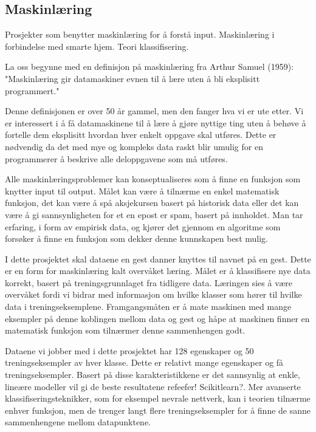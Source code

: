 \subsection{Maskinlæring}
{\color{blue}
Prosjekter som benytter maskinlæring for å forstå input. Maskinlæring i forbindelse med smarte hjem. Teori klassifisering.

La oss begynne med en definisjon på maskinlæring fra Arthur Samuel (1959): "Maskinlæring gir datamaskiner evnen til å lære uten å bli eksplisitt programmert."

Denne definisjonen er over 50 år gammel, men den fanger hva vi er ute etter. Vi er interessert i å få datamaskinene til å lære å gjøre nyttige ting uten å behøve å fortelle dem eksplisitt hvordan hver enkelt oppgave skal utføres. Dette er nødvendig da det med mye og kompleks data raskt blir umulig for en programmerer å beskrive alle deloppgavene som må utføres.

Alle maskinlæringsproblemer kan konseptualiseres som å finne en funksjon som knytter input til output. Målet kan være å tilnærme en enkel matematisk funksjon, det kan være å spå aksjekursen basert på historisk data eller det kan være å gi sannsynligheten for et en epost er spam, basert på innholdet. Man tar erfaring, i form av empirisk data, og kjører det gjennom en algoritme som forsøker å finne en funksjon som dekker denne kunnskapen best mulig.

I dette prosjektet skal dataene en gest danner knyttes til navnet på en gest. Dette er en form for maskinlæring kalt overvåket læring. Målet er å klassifisere nye data korrekt, basert på treningsgrunnlaget fra tidligere data. Læringen sies å være overvåket fordi vi bidrar med informasjon om hvilke klasser som hører til hvilke data i treningseksemplene. Framgangsmåten er å mate maskinen med mange eksempler på denne koblingen mellom data og gest og håpe at maskinen finner en matematisk funksjon som tilnærmer denne sammenhengen godt.

Dataene vi jobber med i dette prosjektet har 128 egenskaper og 50 treningseksempler av hver klasse. Dette er relativt mange egenskaper og få treningseksempler. Basert på disse karakteristikkene er det sannsynlig at enkle, lineære modeller vil gi de beste resultatene {\color{red} refeefer! Scikitlearn?}. Mer avanserte klassifiseringsteknikker, som for eksempel nevrale nettverk, kan i teorien tilnærme enhver funksjon, men de trenger langt flere treningseksempler for å finne de sanne sammenhengene mellom datapunktene.

}
